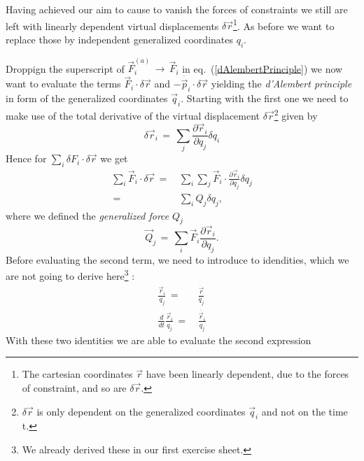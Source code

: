 Having achieved our aim to cause to vanish the forces of constraints we still
are left with linearly dependent virtual displacements $\delta \vec
r$\footnote{The cartesian coordinates $\vec r$ have been linearly dependent,
due to the forces of constraint, and so are $\delta \vec r$.}. As before we
want to replace those by independent generalized coordinates $q_i$.

Droppign the superscript of $\vec F_i^{(a)} \,\to\, \vec F_i$ in
eq.~(\ref{dAlembertPrinciple}) we now want to evaluate the terms $\vec F_i
\cdot \delta \vec r$ and $- \dot{\vec p_i} \cdot \delta \vec r$ yielding the
\textit{d'Alembert principle} in form of the generalized coordinates $\vec
q_i$. Starting with the first one we need to make use of the total derivative
of the virtual displacement $\delta \vec r$\footnote{$\delta \vec r$ is only
dependent on the generalized coordinates $\vec q_i$ and not on the time t.}
given by
\begin{equation}
  \delta \vec r_i \,=\, \sum_j \frac{\partial \vec r_i}{\partial q_j} \delta
q_i 
\end{equation}
Hence for $\sum_i \delta F_i \cdot \delta \vec r$ we get
\begin{equation}
  \label{dAlembertFirst}
  \begin{aligned}
    \sum_i \vec F_i \cdot \delta \vec r \,=\,& \sum_i \sum_j \vec F_i \cdot
\frac{\partial \vec r_i}{\partial q_j} \delta q_j \\
    \,=\,& \sum_i Q_j \delta q_j,
  \end{aligned}
\end{equation}
where we defined the \textit{generalized force} $Q_j$ 
\begin{equation}
  \label{generalizedForce}
  \vec Q_j \,=\, \sum_i \vec F_i \frac{\partial \vec r_i}{\partial q_j}.
\end{equation}
Before evaluating the second term, we need to introduce to
idendities, which we are not going to derive here\footnote{We already derived these in our first exercise sheet.} :
\begin{align}
  \frac{\vec r_i}{q_j} \,=\,& \frac{\dot{\vec r}}{\dot{q_j}} \\
  \frac{d}{dt} \frac{\vec r_i}{q_j} \,=\,& \frac{\dot{\vec r_i}}{q_j}
\end{align}
With these two identities we are able to evaluate the second expression
